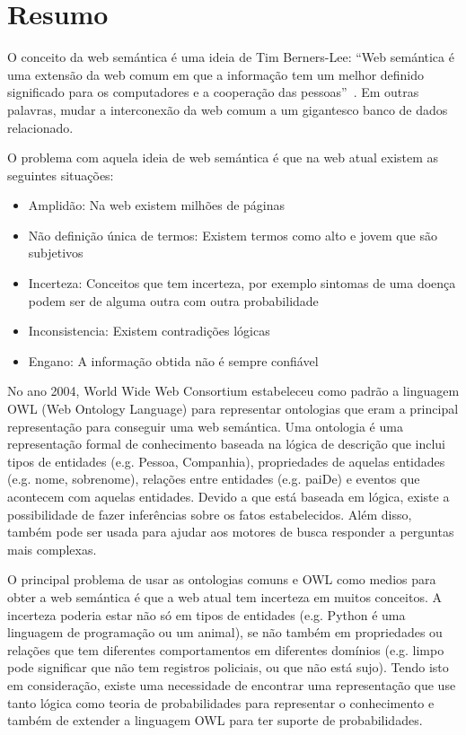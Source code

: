 \section{Resumo}
\label{sec:resumo}

O conceito da web semántica é uma ideia de Tim Berners-Lee: ``Web semántica é uma extensão da web comum em que a informação tem um melhor definido significado para os computadores e a cooperação das pessoas''~\cite{BernersLee01}. Em outras palavras, mudar a interconexão da web comum a um gigantesco banco de dados relacionado.

O problema com aquela ideia de web semántica é que na web atual existem as seguintes situações:
\begin{itemize}
	\item Amplidão: Na web existem milhões de páginas
	\item Não definição única de termos: Existem termos como alto e jovem que são subjetivos
	\item Incerteza: Conceitos que tem incerteza, por exemplo sintomas de uma doença podem ser de alguma outra com outra probabilidade
	\item Inconsistencia: Existem contradições lógicas
	\item Engano: A informação obtida não é sempre confiável
\end{itemize}

No ano 2004, World Wide Web Consortium estabeleceu como padrão a linguagem OWL (Web Ontology Language) para representar ontologias que eram a principal representação para conseguir uma web semántica. Uma ontologia é uma representação formal de conhecimento baseada na lógica de descrição que inclui tipos de entidades (e.g. Pessoa, Companhia), propriedades de aquelas entidades (e.g. nome, sobrenome), relações entre entidades (e.g. paiDe) e eventos que acontecem com aquelas entidades. Devido a que está baseada em lógica, existe a possibilidade de fazer inferências sobre os fatos estabelecidos. Além disso, também pode ser usada para ajudar aos motores de busca responder a perguntas mais complexas.

O principal problema de usar as ontologias comuns e OWL como medios para obter a web semántica é que a web atual tem incerteza em muitos conceitos. A incerteza poderia estar não só em tipos de entidades (e.g. Python é uma linguagem de programação ou um animal), se não também em propriedades ou relações que tem diferentes comportamentos em diferentes domínios (e.g. limpo pode significar que não tem registros policiais, ou que não está sujo). Tendo isto em consideração, existe uma necessidade de encontrar uma representação que use tanto lógica como teoria de probabilidades para representar o conhecimento e também de extender a linguagem OWL para ter suporte de probabilidades.


